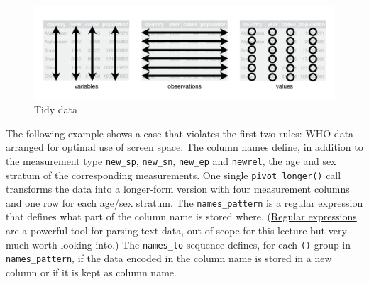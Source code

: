 \documentclass[]{book}
\newenvironment{Shaded}{}{}
\newcommand{\KeywordTok}[1]{\textcolor[rgb]{0.00,0.00,1.00}{#1}}
\newcommand{\NormalTok}[1]{#1}
\newcommand{\OperatorTok}[1]{#1}
\newcommand{\StringTok}[1]{\textcolor[rgb]{0.00,0.50,0.50}{#1}}
\begin{document}
\begin{figure}
\centering
\includegraphics{img/tidy-1.png}
\caption{Tidy data}
\end{figure}

The following example shows a case that violates the first two rules: WHO data arranged for optimal use of screen space.
The column names define, in addition to the measurement type \texttt{new\_sp}, \texttt{new\_sn}, \texttt{new\_ep} and \texttt{newrel}, the age and sex stratum of the corresponding measurements.
One single \texttt{pivot\_longer()} call transforms the data into a longer-form version with four measurement columns and one row for each age/sex stratum.
The \texttt{names\_pattern} is a regular expression that defines what part of the column name is stored where.
(\href{https://en.wikipedia.org/wiki/Regular_expression}{Regular expressions} are a powerful tool for parsing text data, out of scope for this lecture but very much worth looking into.)
The \texttt{names\_to} sequence defines, for each \texttt{()} group in \texttt{names\_pattern}, if the data encoded in the column name is stored in a new column or if it is kept as column name.

\begin{Shaded}
\end{Shaded}
\end{document}
